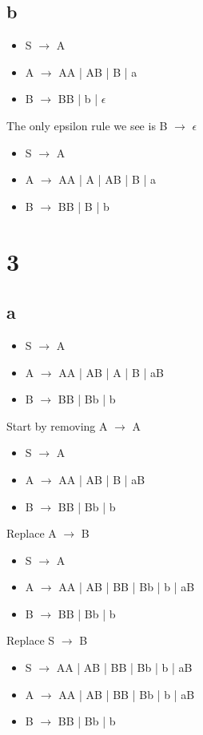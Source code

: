 \documentclass[11pt]{article}
\begin{document}
\subsection{b}
\label{sec:orgb81e73e}
\begin{itemize}
\item S \(\rightarrow\) A
\item A \(\rightarrow\) AA | AB | B | a
\item B \(\rightarrow\) BB | b | \(\epsilon{}\)
\end{itemize}

The only epsilon rule we see is B \(\rightarrow\) \(\epsilon{}\)
\begin{itemize}
\item S \(\rightarrow\) A
\item A \(\rightarrow\) AA | A | AB | B | a
\item B \(\rightarrow\) BB | B | b
\end{itemize}
\section{3}
\label{sec:org9c8e69a}
\subsection{a}
\label{sec:orge55d5e7}
\begin{itemize}
\item S \(\rightarrow\) A
\item A \(\rightarrow\) AA | AB | A | B | aB
\item B \(\rightarrow\) BB | Bb | b
\end{itemize}

Start by removing A \(\rightarrow\) A
\begin{itemize}
\item S \(\rightarrow\) A
\item A \(\rightarrow\) AA | AB | B | aB
\item B \(\rightarrow\) BB | Bb | b
\end{itemize}

Replace A \(\rightarrow\) B
\begin{itemize}
\item S \(\rightarrow\) A
\item A \(\rightarrow\) AA | AB | BB | Bb | b | aB
\item B \(\rightarrow\) BB | Bb | b
\end{itemize}

Replace S \(\rightarrow\) B
\begin{itemize}
\item S \(\rightarrow\) AA | AB | BB | Bb | b | aB
\item A \(\rightarrow\) AA | AB | BB | Bb | b | aB
\item B \(\rightarrow\) BB | Bb | b
\end{itemize}
\end{document}
